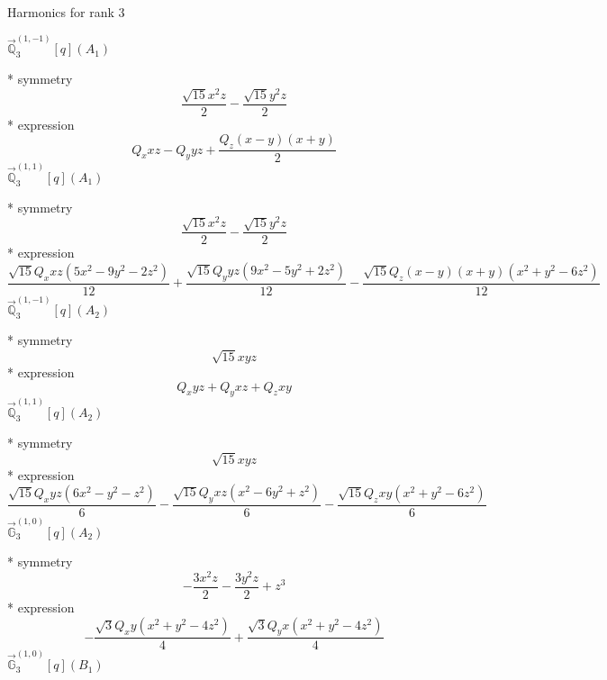 \documentclass[fleqn,8pt]{jsarticle}
\begin{document}
\noindent * Harmonics for rank 3

\noindent\quad $\vec{\mathbb{Q}}_{3}^{(1,-1)}[q](A_{1})$

\noindent\quad ** symmetry
\begin{dmath*}
\frac{\sqrt{15} x^{2} z}{2} - \frac{\sqrt{15} y^{2} z}{2}
\end{dmath*}
\noindent\quad ** expression
\begin{dmath*}
Q_{x} x z - Q_{y} y z + \frac{Q_{z} \left(x - y\right) \left(x + y\right)}{2}
\end{dmath*}
\noindent\quad $\vec{\mathbb{Q}}_{3}^{(1,1)}[q](A_{1})$

\noindent\quad ** symmetry
\begin{dmath*}
\frac{\sqrt{15} x^{2} z}{2} - \frac{\sqrt{15} y^{2} z}{2}
\end{dmath*}
\noindent\quad ** expression
\begin{dmath*}
\frac{\sqrt{15} Q_{x} x z \left(5 x^{2} - 9 y^{2} - 2 z^{2}\right)}{12} + \frac{\sqrt{15} Q_{y} y z \left(9 x^{2} - 5 y^{2} + 2 z^{2}\right)}{12} - \frac{\sqrt{15} Q_{z} \left(x - y\right) \left(x + y\right) \left(x^{2} + y^{2} - 6 z^{2}\right)}{12}
\end{dmath*}
\noindent\quad $\vec{\mathbb{Q}}_{3}^{(1,-1)}[q](A_{2})$

\noindent\quad ** symmetry
\begin{dmath*}
\sqrt{15} x y z
\end{dmath*}
\noindent\quad ** expression
\begin{dmath*}
Q_{x} y z + Q_{y} x z + Q_{z} x y
\end{dmath*}
\noindent\quad $\vec{\mathbb{Q}}_{3}^{(1,1)}[q](A_{2})$

\noindent\quad ** symmetry
\begin{dmath*}
\sqrt{15} x y z
\end{dmath*}
\noindent\quad ** expression
\begin{dmath*}
\frac{\sqrt{15} Q_{x} y z \left(6 x^{2} - y^{2} - z^{2}\right)}{6} - \frac{\sqrt{15} Q_{y} x z \left(x^{2} - 6 y^{2} + z^{2}\right)}{6} - \frac{\sqrt{15} Q_{z} x y \left(x^{2} + y^{2} - 6 z^{2}\right)}{6}
\end{dmath*}
\noindent\quad $\vec{\mathbb{G}}_{3}^{(1,0)}[q](A_{2})$

\noindent\quad ** symmetry
\begin{dmath*}
- \frac{3 x^{2} z}{2} - \frac{3 y^{2} z}{2} + z^{3}
\end{dmath*}
\noindent\quad ** expression
\begin{dmath*}
- \frac{\sqrt{3} Q_{x} y \left(x^{2} + y^{2} - 4 z^{2}\right)}{4} + \frac{\sqrt{3} Q_{y} x \left(x^{2} + y^{2} - 4 z^{2}\right)}{4}
\end{dmath*}
\noindent\quad $\vec{\mathbb{G}}_{3}^{(1,0)}[q](B_{1})$
\end{document}
